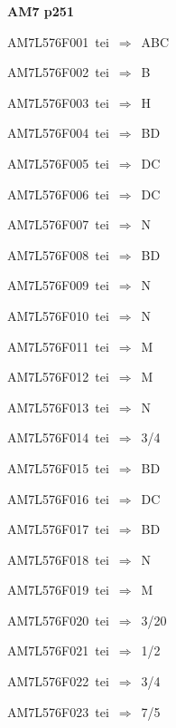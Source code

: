 \par\vfill\eject
{\bf\hfill AM7 p251\hfill\hbox{}}\par\bigskip
{\sixrm AM7L576F001\ {\sixit tei}\ }$\Rightarrow$\ ABC\par\smallskip
{\sixrm AM7L576F002\ {\sixit tei}\ }$\Rightarrow$\ B\par\smallskip
{\sixrm AM7L576F003\ {\sixit tei}\ }$\Rightarrow$\ H\par\smallskip
{\sixrm AM7L576F004\ {\sixit tei}\ }$\Rightarrow$\ BD\par\smallskip
{\sixrm AM7L576F005\ {\sixit tei}\ }$\Rightarrow$\ DC\par\smallskip
{\sixrm AM7L576F006\ {\sixit tei}\ }$\Rightarrow$\ DC\par\smallskip
{\sixrm AM7L576F007\ {\sixit tei}\ }$\Rightarrow$\ N\par\smallskip
{\sixrm AM7L576F008\ {\sixit tei}\ }$\Rightarrow$\ BD\par\smallskip
{\sixrm AM7L576F009\ {\sixit tei}\ }$\Rightarrow$\ N\par\smallskip
{\sixrm AM7L576F010\ {\sixit tei}\ }$\Rightarrow$\ N\par\smallskip
{\sixrm AM7L576F011\ {\sixit tei}\ }$\Rightarrow$\ M\par\smallskip
{\sixrm AM7L576F012\ {\sixit tei}\ }$\Rightarrow$\ M\par\smallskip
{\sixrm AM7L576F013\ {\sixit tei}\ }$\Rightarrow$\ N\par\smallskip
{\sixrm AM7L576F014\ {\sixit tei}\ }$\Rightarrow$\ 3/4\par\smallskip
{\sixrm AM7L576F015\ {\sixit tei}\ }$\Rightarrow$\ BD\par\smallskip
{\sixrm AM7L576F016\ {\sixit tei}\ }$\Rightarrow$\ DC\par\smallskip
{\sixrm AM7L576F017\ {\sixit tei}\ }$\Rightarrow$\ BD\par\smallskip
{\sixrm AM7L576F018\ {\sixit tei}\ }$\Rightarrow$\ N\par\smallskip
{\sixrm AM7L576F019\ {\sixit tei}\ }$\Rightarrow$\ M\par\smallskip
{\sixrm AM7L576F020\ {\sixit tei}\ }$\Rightarrow$\ 3/20\par\smallskip
{\sixrm AM7L576F021\ {\sixit tei}\ }$\Rightarrow$\ 1/2\par\smallskip
{\sixrm AM7L576F022\ {\sixit tei}\ }$\Rightarrow$\ 3/4\par\smallskip
{\sixrm AM7L576F023\ {\sixit tei}\ }$\Rightarrow$\ 7/5\par\smallskip
